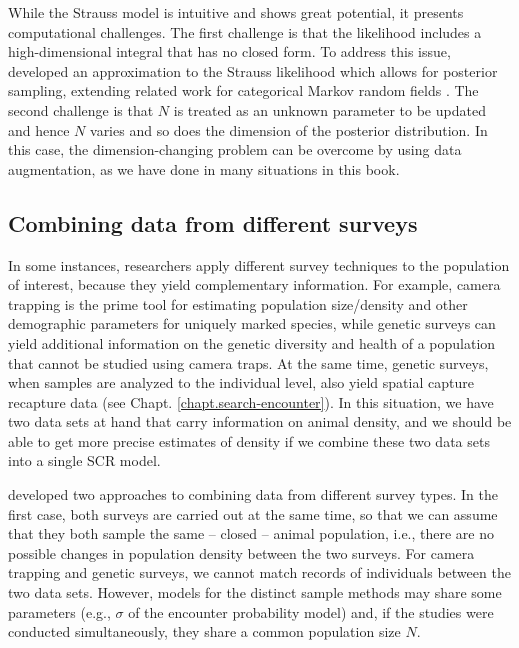 While the Strauss model is intuitive and shows great potential, it
presents computational challenges. The first challenge is that the
likelihood includes a high-dimensional integral that has no closed
form. To address this issue, \citet{reich_etal:2012} developed an
approximation to the Strauss likelihood which allows for posterior
sampling, extending related work for categorical Markov random fields
\citep{green_richardson:2002,smith_smith:2006}. The second challenge
is that $N$ is treated as an unknown parameter to be updated and hence
$N$ varies and so does the dimension of the posterior distribution.
In this case, the dimension-changing problem can be overcome by using
data augmentation, as we have done in many situations in this book.

\subsection{Combining data from different surveys}

In some instances, researchers apply different survey techniques to
the population of interest, because they yield complementary
information. For example, camera trapping is the prime tool for
estimating population size/density and other demographic parameters
for uniquely marked species, while genetic surveys can yield
additional information on the genetic diversity and health of a
population that cannot be studied using camera traps. At the same
time, genetic surveys, when samples are analyzed to the individual
level, also yield spatial capture recapture data (see
Chapt. \ref{chapt.search-encounter}). In this situation, we have two
data sets at hand that carry information on animal density, and we
should be able to get more precise estimates of density if we combine
these two data sets into a single SCR model.

\citet{gopalaswamy_etal:2012mee} developed two approaches to combining
data from different survey types. In the first case, both surveys are
carried out at the same time, so that we can assume that they both
sample the same -- closed -- animal population, i.e., there are no
possible changes in population density between the two surveys. For
camera trapping and genetic surveys, we cannot match records of
individuals between the two data sets. However, models for the
distinct sample methods may share some parameters (e.g., $\sigma$ of
the encounter probability model) and, if the studies were conducted
simultaneously, they share a common population size $N$.

